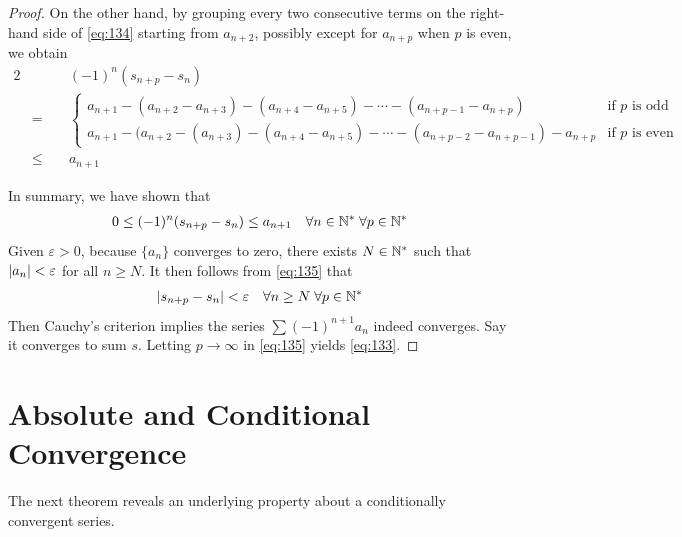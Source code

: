 \documentclass[thmcnt=section, 12pt]{my-elegantbook}
\begin{document}
\begin{proof}
    On the other hand,
    by grouping every two consecutive terms
    on the right-hand side of \eqref{eq:134}
    starting from $a_{n+2}$,
    possibly except for $a_{n+p}$ when $p$ is even,
    we obtain
    \begin{alignat*}{2}
         &      & \; & (-1)^{n} (s_{n+p} - s_{n})                          \\
         & =    &    & \begin{cases}
                           a_{n+1} - (a_{n+2} - a_{n+3}) - (a_{n+4} - a_{n+5})
                           - \cdots - (a_{n+p-1} - a_{n+p})
                            & \text{if $p$ is odd}  \\
                           a_{n+1} - (a_{n+2} - (a_{n+3}) - (a_{n+4} - a_{n+5})
                           - \cdots - (a_{n+p-2} - a_{n+p-1}) - a_{n+p}
                            & \text{if $p$ is even}
                       \end{cases} \\
         & \leq &    & a_{n+1}
    \end{alignat*}

    In summary, we have shown that
    \begin{align}
        0 \leq (-1)^n (s_{n+p} - s_{n}) \leq a_{n+1}
        \quad \forall n \in \mathbb{N}^\ast \;
        \forall p \in \mathbb{N}^\ast
        \label{eq:135}
    \end{align}
    Given $\varepsilon > 0$,
    because $\{a_n\}$ converges to zero,
    there exists $N \in \mathbb{N}^\ast$ such that
    $\left\lvert a_n \right\rvert < \varepsilon$ for all $n \geq N$.
    It then follows from \eqref{eq:135} that
    \begin{align*}
        \left\lvert s_{n+p} - s_n \right\rvert < \varepsilon
        \quad \forall n \geq N \;
        \forall p \in \mathbb{N}^\ast
    \end{align*}
    Then Cauchy's criterion implies
    the series $\sum (-1)^{n+1} a_n$ indeed converges.
    Say it converges to sum $s$.
    Letting $p \to \infty$ in \eqref{eq:135} yields \eqref{eq:133}.
\end{proof}


\section{Absolute and Conditional Convergence}


The next theorem reveals an underlying property
about a conditionally convergent series.
\end{document}
